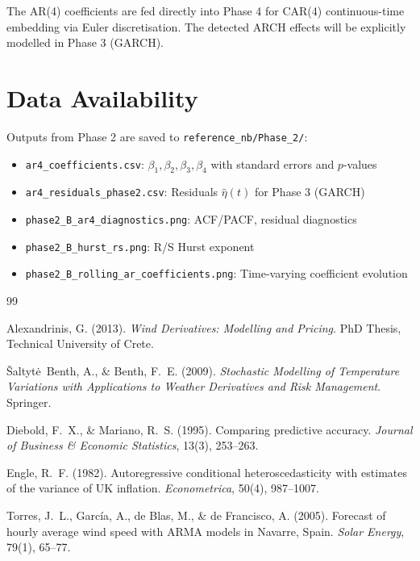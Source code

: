 \documentclass[11pt]{article}
\begin{document}
The AR(4) coefficients are fed directly into Phase 4 for CAR(4) continuous-time embedding via Euler discretisation. The detected ARCH effects will be explicitly modelled in Phase 3 (GARCH).

\section*{Data Availability}

Outputs from Phase 2 are saved to \texttt{reference\_nb/Phase\_2/}:
\begin{itemize}
  \item \texttt{ar4\_coefficients.csv}: $\beta_1, \beta_2, \beta_3, \beta_4$ with standard errors and $p$-values
  \item \texttt{ar4\_residuals\_phase2.csv}: Residuals $\widehat{\eta}(t)$ for Phase 3 (GARCH)
  \item \texttt{phase2\_B\_ar4\_diagnostics.png}: ACF/PACF, residual diagnostics
  \item \texttt{phase2\_B\_hurst\_rs.png}: R/S Hurst exponent
  \item \texttt{phase2\_B\_rolling\_ar\_coefficients.png}: Time-varying coefficient evolution
\end{itemize}

\newpage

\begin{thebibliography}{99}

Alexandrinis, G. (2013).
\textit{Wind Derivatives: Modelling and Pricing}.
PhD Thesis, Technical University of Crete.

Šaltytė~Benth, A., \& Benth, F.~E. (2009).
\textit{Stochastic Modelling of Temperature Variations with Applications to Weather Derivatives and Risk Management}.
Springer.

Diebold, F.~X., \& Mariano, R.~S. (1995).
Comparing predictive accuracy.
\textit{Journal of Business \& Economic Statistics}, 13(3), 253--263.

Engle, R.~F. (1982).
Autoregressive conditional heteroscedasticity with estimates of the variance of UK inflation.
\textit{Econometrica}, 50(4), 987--1007.

Torres, J.~L., García, A., de Blas, M., \& de Francisco, A. (2005).
Forecast of hourly average wind speed with ARMA models in Navarre, Spain.
\textit{Solar Energy}, 79(1), 65--77.

\end{thebibliography}
\end{document}
